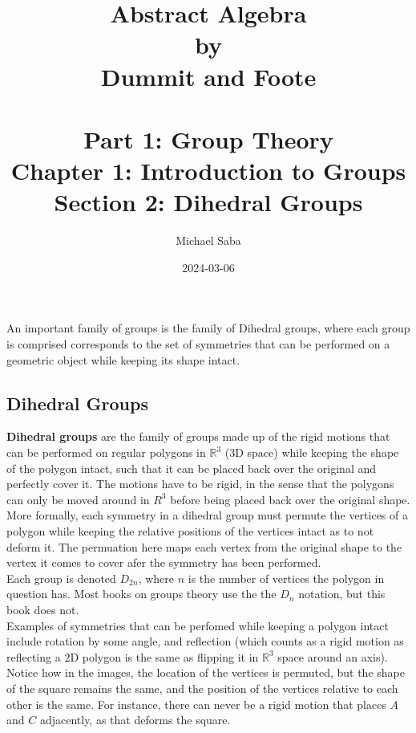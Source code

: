 \documentclass[12pt]{article}
\title{%
    \Huge Abstract Algebra \\
    \large by \\
    \Large Dummit and Foote \\~\\
    \huge Part 1: Group Theory \\
    \LARGE Chapter 1: Introduction to Groups \\
    \Large Section 2: Dihedral Groups
}
\date{2024-03-06}
\author{Michael Saba}
\newcommand{\R}{\mathbb{R}}
\begin{document}
    \maketitle
    \newpage


    An important family of groups
    is the family of Dihedral groups,
    where each group is comprised corresponds to the set of symmetries 
    that can be performed on a geometric object
    while keeping its shape intact. \\

    \subsection*{Dihedral Groups}

    \textbf{Dihedral groups} are the family of groups
    made up of the rigid motions that can be performed on regular polygons
    in $\R^3$ ($3$D space)
    while keeping the shape of the polygon intact,
    such that it can be placed back over the original
    and perfectly cover it.
    The motions have to be rigid,
    in the sense that the polygons can only be moved around in $R^3$
    before being placed back over the original shape. \\
    More formally,
    each symmetry in a dihedral group must permute the vertices of a polygon
    while keeping the relative positions of the vertices intact as to
    not deform it.
    The permuation here maps each vertex from the original shape
    to the vertex it comes to cover afer the symmetry has been performed. \\

    Each group is denoted $D_{2n}$,
    where $n$ is the number of vertices the polygon in question has.
    Most books on groups theory use the the $D_n$ notation,
    but this book does not. \\

    Examples of symmetries that can be perfomed
    while keeping a polygon intact include rotation by some angle,
    and reflection
    (which counts as a rigid motion as reflecting a $2$D polygon
    is the same as flipping it in $\R^3$ space around an axis). \\ 
    Notice how in the images,
    the location of the vertices is permuted,
    but the shape of the square remains the same,
    and the position of the vertices relative to each other is the same.
    For instance, there can never be a rigid motion that places
    $A$ and $C$ adjacently,
    as that deforms the square. \\
\end{document}
